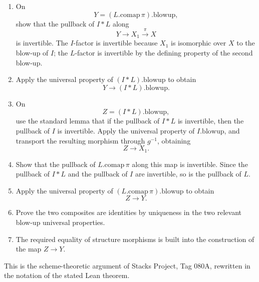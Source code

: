 \documentclass[11pt]{article}
\begin{document}
\begin{enumerate}
  \item On
  \[
    Y=(L.\mathrm{comap}\,\pi).\mathrm{blowup},
  \]
  show that the pullback of \(I*L\) along
  \[
    Y\to X_1\overset{\pi}{\to}X
  \]
  is invertible.  The \(I\)-factor is invertible because \(X_1\) is
  isomorphic over \(X\) to the blow-up of \(I\); the \(L\)-factor is
  invertible by the defining property of the second blow-up.

  \item Apply the universal property of \((I*L).\mathrm{blowup}\) to obtain
  \[
    Y\to (I*L).\mathrm{blowup}.
  \]

  \item On
  \[
    Z=(I*L).\mathrm{blowup},
  \]
  use the standard lemma that if the pullback of \(I*L\) is invertible,
  then the pullback of \(I\) is invertible.  Apply the universal property
  of \(I.\mathrm{blowup}\), and transport the resulting morphism through
  \(g^{-1}\), obtaining
  \[
    Z\to X_1.
  \]

  \item Show that the pullback of \(L.\mathrm{comap}\,\pi\) along this map
  is invertible.  Since the pullback of \(I*L\) and the pullback of \(I\)
  are invertible, so is the pullback of \(L\).

  \item Apply the universal property of
  \((L.\mathrm{comap}\,\pi).\mathrm{blowup}\) to obtain
  \[
    Z\to Y.
  \]

  \item Prove the two composites are identities by uniqueness in the two
  relevant blow-up universal properties.

  \item The required equality of structure morphisms is built into the
  construction of the map \(Z\to Y\).
\end{enumerate}

This is the scheme-theoretic argument of Stacks Project, Tag 080A, rewritten
in the notation of the stated Lean theorem.
\end{document}
